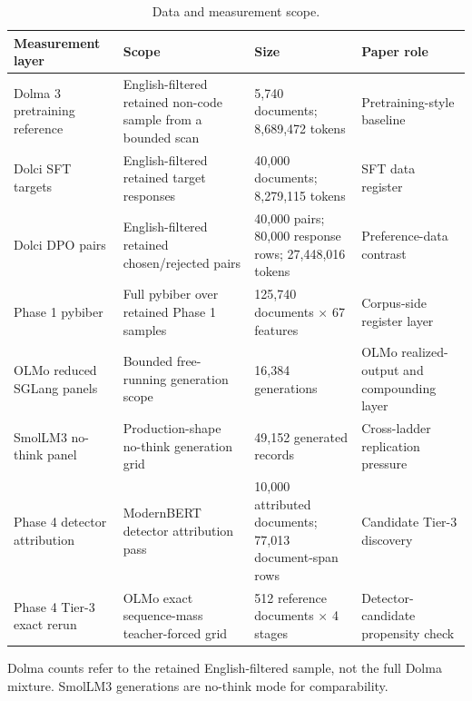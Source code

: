 
\begin{table}[t]
\centering
\caption{Data and measurement scope.}
\label{tab:data-scope}
\begin{threeparttable}
\small
\begin{tabularx}{\textwidth}{@{}p{}X p{} p{}@{}}
\toprule
Measurement layer & Scope & Size & Paper role \\
\midrule
Dolma 3 pretraining reference & English-filtered retained non-code sample from a bounded scan & 5,740 documents; 8,689,472 tokens & Pretraining-style baseline \\
Dolci SFT targets & English-filtered retained target responses & 40,000 documents; 8,279,115 tokens & SFT data register \\
Dolci DPO pairs & English-filtered retained chosen/rejected pairs & 40,000 pairs; 80,000 response rows; 27,448,016 tokens & Preference-data contrast \\
Phase 1 pybiber & Full pybiber over retained Phase 1 samples & 125,740 documents $\times$ 67 features & Corpus-side register layer \\
OLMo reduced SGLang panels & Bounded free-running generation scope & 16,384 generations & OLMo realized-output and compounding layer \\
SmolLM3 no-think panel & Production-shape no-think generation grid & 49,152 generated records & Cross-ladder replication pressure \\
Phase 4 detector attribution & ModernBERT detector attribution pass & 10,000 attributed documents; 77,013 document-span rows & Candidate Tier-3 discovery \\
Phase 4 Tier-3 exact rerun & OLMo exact sequence-mass teacher-forced grid & 512 reference documents $\times$ 4 stages & Detector-candidate propensity check \\
\bottomrule
\end{tabularx}
\begin{tablenotes}
\footnotesize
\item Dolma counts refer to the retained English-filtered sample, not the full Dolma mixture. SmolLM3 generations are no-think mode for comparability.
\end{tablenotes}
\end{threeparttable}
\end{table}

